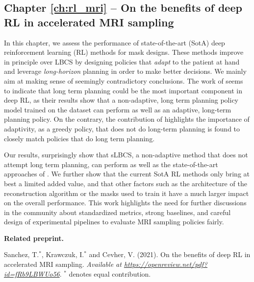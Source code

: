 \subsection*{Chapter \ref{ch:rl_mri} -- On the benefits of deep RL in accelerated MRI sampling}
In this chapter, we assess the performance of state-of-the-art (SotA) deep reinforcement learning (RL) methods for mask designs. These methods improve in principle over LBCS by designing policies that \textit{adapt} to the patient at hand and leverage \textit{long-horizon} planning in order to make better decisions. We mainly aim at making sense of seemingly contradictory conclusions. The work of \citet{pineda2020active} seems to indicate that long term planning could be the most important component in deep RL, as their results show that a non-adaptive, long term planning policy model trained on the dataset can perform as well as an adaptive, long-term planning policy. On the contrary, the contribution of \citet{bakker2020experimental} highlights the importance of adaptivity, as a greedy policy, that does not do long-term planning is found to closely match policies that do long term planning.

Our results, surprisingly show that sLBCS, a non-adaptive method that does not attempt long term planning, can perform as well as the state-of-the-art approaches of \citet{pineda2020active,bakker2020experimental}. We further show that the current SotA RL methods only bring at best a limited added value, and that other factors such as the architecture of the reconstruction algorithm or the masks used to train it have a much larger impact on the overall performance. This work  highlights the need for further discussions in the community about standardized metrics, strong baselines, and careful design of experimental pipelines to evaluate MRI sampling policies fairly.

\textbf{Related preprint.}
\begin{adjustwidth}{.5cm}{}
Sanchez, T.$^{*}$, Krawczuk, I.$^{*}$ and Cevher, V. (2021). On the benefits of deep RL in accelerated MRI sampling. \textit{Available at \url{https://openreview.net/pdf?id=fRb9LBWUo56}}. $^{*}$ denotes equal contribution.
\end{adjustwidth}

